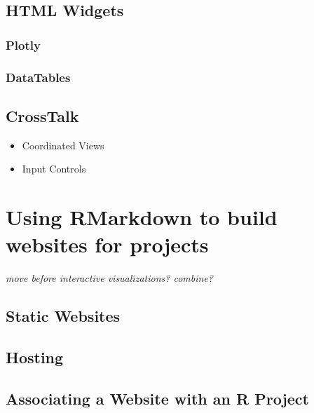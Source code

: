\documentclass[
]{krantz}
\providecommand{\tightlist}{%
  \setlength{\itemsep}{0pt}\setlength{\parskip}{0pt}}
\begin{document}
\hypertarget{html-widgets}{%
\section{HTML Widgets}\label{html-widgets}}

\hypertarget{plotly}{%
\subsection{Plotly}\label{plotly}}

\hypertarget{datatables}{%
\subsection{DataTables}\label{datatables}}

\hypertarget{crosstalk}{%
\section{CrossTalk}\label{crosstalk}}

\begin{itemize}
\tightlist
\item
  Coordinated Views
\item
  Input Controls
\end{itemize}

\hypertarget{rmarkdown-websites}{%
\chapter{Using RMarkdown to build websites for projects}\label{rmarkdown-websites}}

\emph{move before interactive visualizations? combine?}

\hypertarget{static-websites}{%
\section{Static Websites}\label{static-websites}}

\hypertarget{hosting}{%
\section{Hosting}\label{hosting}}

\hypertarget{associating-a-website-with-an-r-project}{%
\section{Associating a Website with an R Project}\label{associating-a-website-with-an-r-project}}
\end{document}
